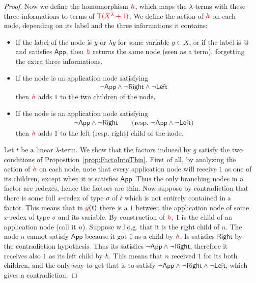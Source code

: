 \begin{proof}
Now we define the homomorphism ${\color{red}{h}}$, which maps the $\lambda$-terms with these three informations to terms of ${\color{red}{{\color{red}{\mathsf T}}({\color{red}{X^\lambda}}+1)}}$. We define the action of ${\color{red}{h}}$ on each node, depending on its label and the three informations it contains:
\begin{itemize}
\item If the label of the node is $y$ or $\lambda y$ for some variable $y\in X$, or if the label is $@$ and satisfies $\mathsf{App}$, then ${\color{red}{h}}$ returns the same node (seen as a term), forgetting the extra three informations.
\item If the node is an application node satisfying 
\begin{align*}
\neg \mathsf{App} \wedge \neg \mathsf{Right} \wedge\neg \mathsf{Left} 
\end{align*} 
then ${\color{red}{h}}$ adds $1$ to the two children of the node.
\item If the node is an application node satisfying 
\begin{align*}
\neg \mathsf{App} \wedge \neg \mathsf{Right} \qquad\text{(resp. } \neg \mathsf{App} \wedge \neg \mathsf{Left} \text{)}
\end{align*} 
then ${\color{red}{h}}$ adds $1$ to the left (resp. right) child of the node. 
\end{itemize}
Let $t$ be a linear $\lambda$-term. We show that the factors induced by $g$ satisfy the two conditions of Proposition~\ref{prop:FactoIntoThin}. First of all, by analyzing the action of ${\color{red}{h}}$ on each node, note that every application node will receive $1$ as one of its children, except when it is satisfies $\mathsf{App}$. Thus the only branching nodes in a factor are redexes, hence the factors are thin. Now suppose by contradiction that there is some full $x$-redex of type $\sigma$ of $t$ which is not entirely contained in a factor. This means that in ${\color{red}{g}}(t)$ there is a $1$ between the application node of some $x$-redex of type $\sigma$ and its variable.
By construction of ${\color{red}{h}}$, $1$ is the child of an application node (call it $n$). Suppose w.l.o.g. that it is the right child of $n$. The node $n$ cannot satisfy $\mathsf{App}$ because it got $1$ as a child by ${\color{red}{h}}$. Is satisfies $\mathsf{Right}$ by the contradiction hypothesis. Thus its satisfies $\neg \mathsf{App} \wedge \neg \mathsf{Right}$, therefore it receives also $1$ as its left child by $h$. This means that $n$ received $1$ for its both children, and the only way to get that is to satisfy $\neg \mathsf{App} \wedge \neg \mathsf{Right} \wedge\neg \mathsf{Left}$, which gives a contradiction. 
\end{proof}
